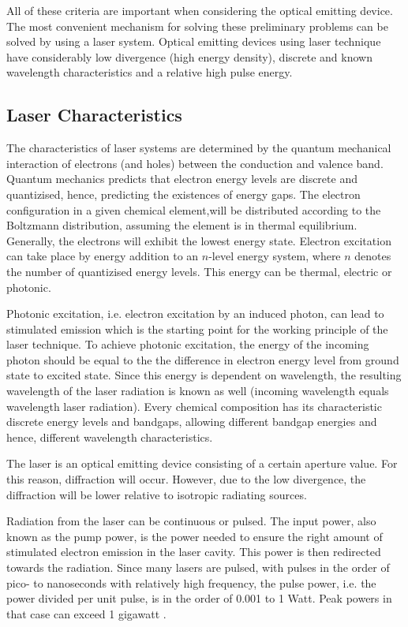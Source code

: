 All of these criteria are important when considering the optical emitting device. The most convenient mechanism for solving these preliminary problems can be solved by using a \ac{laser} system. Optical emitting devices using \acs{laser} technique have considerably low divergence (high energy density),  discrete and known wavelength characteristics and a relative high pulse energy.

\subsection{Laser Characteristics}
	\label{blDOLSRchar}
The characteristics of \acs{laser} systems are determined by the quantum mechanical interaction of electrons (and holes) between the conduction and valence band. Quantum mechanics predicts that electron energy levels are discrete and quantizised, hence, predicting the existences of energy gaps. The electron configuration in a given chemical element,will be distributed according to the Boltzmann distribution, assuming the element is in thermal equilibrium. Generally, the electrons will exhibit the lowest energy state. Electron excitation can take place by energy addition to an $n$-level energy system, where $n$ denotes the number of quantizised energy levels. This energy can be thermal, electric or photonic. 

Photonic excitation, i.e. electron excitation by an induced photon, can lead to stimulated emission which is the starting point for the working principle of the \acs{laser} technique. To achieve photonic excitation, the energy of the incoming photon should be equal to the the difference in electron energy level from ground state to excited state. Since this energy is dependent on wavelength, the resulting wavelength of the \acs{laser} radiation is known as well (incoming wavelength equals wavelength laser radiation). Every chemical composition has its characteristic discrete energy levels and bandgaps, allowing different bandgap energies and hence, different wavelength characteristics. 

The \acs{laser} is an optical emitting device consisting of a certain aperture value. For this reason, diffraction will occur. However, due to the low divergence, the diffraction will be lower relative to isotropic radiating sources.

Radiation from the \acs{laser} can be continuous or pulsed. The input power, also known as the pump power, is the power needed to ensure the right amount of stimulated electron emission in the \acs{laser} cavity. This power is then redirected towards the radiation. Since many \acs{laser}s are pulsed, with pulses in the order of pico- to nanoseconds with relatively high frequency, the pulse power, i.e. the power divided per unit pulse, is in the order of 0.001 to 1 Watt. Peak powers in that case can exceed 1 gigawatt \cite{quantumoptics}.  

